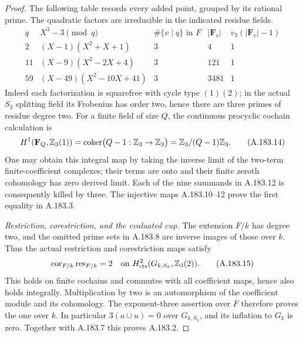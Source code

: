 \begin{proof}
The following table records every added point, grouped by
its rational prime.  The quadratic factors are irreducible
in the indicated residue fields.
\[
\begin{array}{c|c|c|c|c}
 q&X^3-3\pmod q&\#\{v\mid q\}\text{ in }F
       &|\mathbf F_v|&v_3(|\mathbf F_v|-1)\\ \hline
 2&(X-1)(X^2+X+1)&3&4&1\\
 11&(X-9)(X^2-2X+4)&3&121&1\\
 59&(X-49)(X^2-10X+41)&3&3481&1
\end{array}
\tag{A.183.13}
\]
Indeed each factorization is squarefree with cycle type
\((1)(2)\); in the actual \(S_3\) splitting field its
Frobenius has order two, hence there are three primes of
residue degree two.  For a finite field of size \(Q\), the
continuous procyclic cochain calculation is
\[
 H^1(\mathbf F_Q,\mathbb Z_3(1))
       =\operatorname{coker}\bigl(Q-1:\mathbb Z_3\to\mathbb Z_3\bigr)
       =\mathbb Z_3/(Q-1)\mathbb Z_3.
\tag{A.183.14}
\]
One may obtain this integral map by taking the inverse limit
of the two-term finite-coefficient complexes; their terms
are onto and their finite zeroth cohomology has zero derived
limit.  Each of the nine summands in A.183.12 is consequently
killed by three.  The injective maps A.183.10--12 prove the
first equality in A.183.3.

\emph{Restriction, corestriction, and the evaluated cup.}
The extension \(F/k\) has degree two, and the omitted prime
sets in A.183.8 are inverse images of those over \(k\).
Thus the actual restriction and corestriction maps satisfy
\[
 \operatorname{cor}_{F/k}\operatorname{res}_{F/k}=2
       \quad\hbox{on }H^2_{\rm cts}(G_{k,S_k},\mathbb Z_3(2)).
\tag{A.183.15}
\]
This holds on finite cochains and commutes with all coefficient
maps, hence also holds integrally.  Multiplication by two is
an automorphism of the coefficient module and its cohomology.
The exponent-three assertion over \(F\) therefore proves the
one over \(k\).  In particular \(3(a\cup u)=0\) over
\(G_{k,S_k}\), and its inflation to \(G_k\) is zero.
Together with A.183.7 this proves A.183.2.


\end{proof}
